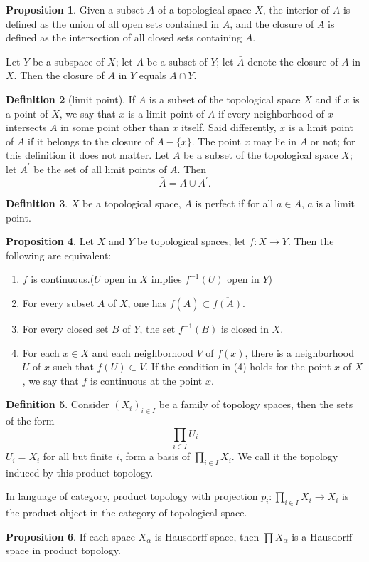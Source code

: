 \documentclass[12pt,a4paper]{book}
\newenvironment{enu}{\begin{enumerate}[(1)]}{\end{enumerate}}
\theoremstyle{definition}
\newtheorem{defn}{Definition}[section]
\newtheorem{prop}[defn]{Proposition}
\begin{document}
\begin{prop}
    Given a subset $A$ of a topological space $X$, the interior of $A$ is defined as the union of all open sets contained in $A$, and the closure of $A$ is defined as the intersection of all closed sets containing $A$.

    Let $Y$ be a subspace of $X$; let $A$ be a subset of $Y$; let $\bar{A}$ denote the closure of $A$ in $X$. Then the closure of $A$ in $Y$ equals $\bar{A} \cap Y$.
\end{prop}
\begin{defn}[limit point]
    If $A$ is a subset of the topological space $X$ and if $x$ is a point of $X$, we say that $x$ is a limit point of $A$ if every neighborhood of $x$ intersects $A$ in some point other than $x$ itself. Said differently, $x$ is a limit point of $A$ if it belongs to the closure of $A-\{x\}$. The point $x$ may lie in $A$ or not; for this definition it does not matter.
    Let $A$ be a subset of the topological space $X$; let $A^{\prime}$ be the set of all limit points of $A$. Then
    $$
        \bar{A}=A \cup A^{\prime} .
    $$
\end{defn}
\begin{defn}
    $X$ be a topological space, $A$ is perfect if for all $a\in A$, $a$ is a limit point.
\end{defn}
\begin{prop}
    Let $X$ and $Y$ be topological spaces; let $f: X \rightarrow Y$. Then the following are equivalent:
    \begin{enu}
        \item  $f$ is continuous.($U$ open in $X$ implies $f^{-1}(U)$ open in $Y$)
        \item  For every subset $A$ of $X$, one has $f(\bar{A}) \subset \overline{f(A)}$.
        \item  For every closed set $B$ of $Y$, the set $f^{-1}(B)$ is closed in $X$.
        \item  For each $x \in X$ and each neighborhood $V$ of $f(x)$, there is a neighborhood $U$ of $x$ such that $f(U) \subset V$.
        If the condition in (4) holds for the point $x$ of $X$, we say that $f$ is continuous at the point $x$.
    \end{enu}
\end{prop}
\begin{defn}
    Consider $(X_i)_{i\in I}$ be a family of topology spaces, then the sets of the form
    \begin{equation*}
        \prod_{i\in I} U_i
    \end{equation*}
    $U_i=X_i$ for all but finite $i$, form a basis of $\prod_{i\in I } X_i$. We call it the topology induced by this product topology.

    In language of category, product topology with projection $p_i: \prod_{i\in I } X_i\rightarrow X_i$ is the product object in the category of topological space.
\end{defn}
\begin{prop}
    If each space $X_\alpha$ is Hausdorff space, then $\prod X_\alpha$ is a Hausdorff space in product topology.
\end{prop}
\end{document}

